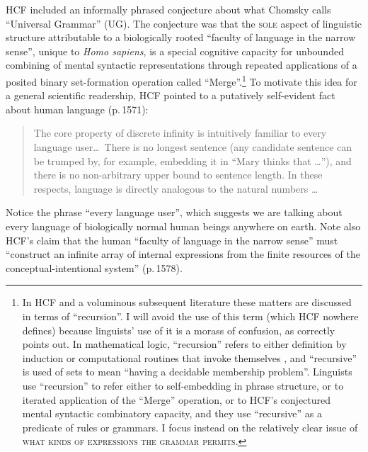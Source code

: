 \documentclass[output=paper,colorlinks,citecolor=brown
]{langscibook}
\begin{document}
HCF included an informally phrased conjecture about what Chomsky calls
``Universal Grammar'' (UG). The conjecture was that the \textsc{sole}
aspect of linguistic structure attributable to a biologically rooted
``faculty of language in the narrow sense'', unique to \textit{Homo sapiens},
is a special cognitive capacity for unbounded combining of mental
syntactic representations through repeated applications of a posited
binary set-formation operation called ``Merge''.\footnote{\label{recursion}%
   In HCF and a voluminous subsequent literature these matters are discussed
   in terms of ``recursion''. I will avoid the use of this term (which
   HCF nowhere defines) because linguists' use of it is a morass of
   confusion, as \citet{Lobina14} correctly points out. In mathematical
   logic, ``recursion'' refers to either definition by induction or
   computational routines that invoke themselves \citep[esp.\ 286--289]{Soare96}, and ``recursive'' is used of sets to mean ``having
   a decidable membership problem''.
   Linguists use ``recursion'' to refer either to self-embedding in
   phrase structure, or to iterated application of the ``Merge''
   operation, or to HCF's conjectured mental syntactic combinatory
   capacity, and they use ``recursive'' as a predicate of rules or
   grammars. I focus instead on the relatively clear issue of
   \textsc{what kinds of expressions the grammar permits}.}
To motivate this idea for a general scientific readership, HCF pointed
to a putatively self-evident fact about human language (p.\,1571):

\begin{quote}
The core property of discrete infinity is intuitively familiar to every
language user\ldots\ There is no longest sentence (any candidate sentence
can be trumped by, for example, embedding it in ``Mary thinks that \ldots''),
and there is no non-arbitrary upper bound to sentence length. In these
respects, language is directly analogous to the natural numbers \ldots
\end{quote}
Notice the phrase ``every language user'', which suggests we are talking
about every language of biologically normal human beings anywhere on
earth. Note also HCF's claim that the human ``faculty of language in the
narrow sense'' must ``construct an infinite array of internal expressions
from the finite resources of the conceptual-intentional system'' (p.\,1578).
\end{document}
